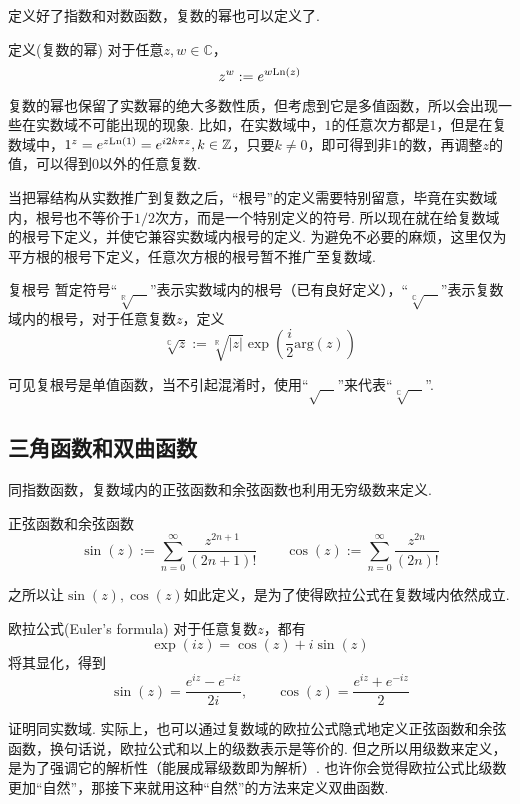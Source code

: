 \documentclass[main.tex]{subfiles}
\begin{document}
定义好了指数和对数函数，复数的幂也可以定义了. 
\begin{definition}{定义(复数的幂)}
    对于任意\(z,w \in \mathbb{C}\)，
    \[z^w := e^{w{\rm Ln}(z)}\]
\end{definition}

复数的幂也保留了实数幂的绝大多数性质，但考虑到它是多值函数，所以会出现一些在实数域不可能出现的现象. 比如，在实数域中，\(1\)的任意次方都是\(1\)，但是在复数域中，\(1^z = e^{z{\rm Ln}(1)} = e^{i2k\pi z}, k \in \mathbb{Z}\)，只要\(k \neq  0\)，即可得到非\(1\)的数，再调整\(z\)的值，可以得到\(0\)以外的任意复数.

当把幂结构从实数推广到复数之后，“根号”的定义需要特别留意，毕竟在实数域内，根号也不等价于\(1/2\)次方，而是一个特别定义的符号. 所以现在就在给复数域的根号下定义，并使它兼容实数域内根号的定义. 为避免不必要的麻烦，这里仅为平方根的根号下定义，任意次方根的根号暂不推广至复数域.

\begin{definition}{复根号}
    暂定符号“\(\sqrt[\mathbb{R}]{\quad}\)”表示实数域内的根号（已有良好定义），“\(\sqrt[\mathbb{C}]{\quad}\)”表示复数域内的根号，对于任意复数\(z\)，定义
    \[\sqrt[\mathbb{C}]{z} := \sqrt[\mathbb{R}]{|z|}\exp\left(\frac{i}{2}\mathrm{arg}(z)\right)\]
\end{definition}
可见复根号是单值函数，当不引起混淆时，使用“\(\sqrt{\quad}\)”来代表“\(\sqrt[\mathbb{C}]{\quad}\)”.

\subsection{三角函数和双曲函数}

同指数函数，复数域内的正弦函数和余弦函数也利用无穷级数来定义.

\begin{definition}{正弦函数和余弦函数}
    \[\sin(z) := \sum_{n=0}^{\infty}\frac{z^{2n+1}}{(2n+1)!} \qquad \cos(z) := \sum_{n=0}^{\infty}\frac{z^{2n}}{(2n)!} \]
\end{definition}

之所以让\(\sin(z),\cos(z)\)如此定义，是为了使得欧拉公式在复数域内依然成立.

\begin{theorem}{欧拉公式(Euler's formula)}
    对于任意复数\(z\)，都有
    \[\exp(iz)=\cos(z)+i\sin(z)\]
    将其显化，得到
    \[\sin(z) = \frac{e^{iz}-e^{-iz}}{2i}, \qquad \cos(z) = \frac{e^{iz}+e^{-iz}}{2}\]
\end{theorem}
证明同实数域. 实际上，也可以通过复数域的欧拉公式隐式地定义正弦函数和余弦函数，换句话说，欧拉公式和以上的级数表示是等价的. 但之所以用级数来定义，是为了强调它的解析性（能展成幂级数即为解析）. 也许你会觉得欧拉公式比级数更加“自然”，那接下来就用这种“自然”的方法来定义双曲函数.
\end{document}
